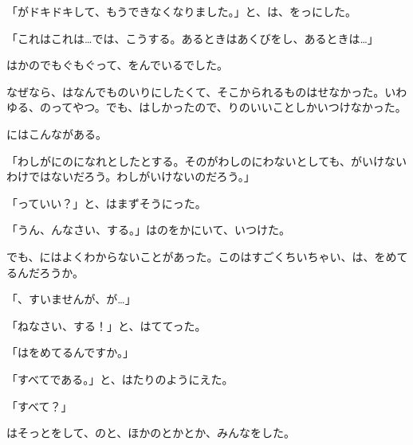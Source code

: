 「がドキドキして、もうできなくなりました。」と、は、をっにした。

「これはこれは…では、こうする。あるときはあくびをし、あるときは…」

はかのでもぐもぐって、をんでいるでした。

なぜなら、はなんでものいりにしたくて、そこかられるものはせなかった。いわゆる、のってやつ。でも、はしかったので、りのいいことしかいつけなかった。

にはこんながある。

「わしがにのになれとしたとする。そのがわしのにわないとしても、がいけないわけではないだろう。わしがいけないのだろう。」

「っていい？」と、はまずそうにった。

「うん、んなさい、する。」はのをかにいて、いつけた。

でも、にはよくわからないことがあった。このはすごくちいちゃい、は、をめてるんだろうか。

「、すいませんが、が…」

「ねなさい、する！」と、はててった。

「はをめてるんですか。」

「すべてである。」と、はたりのようにえた。

「すべて？」

はそっとをして、のと、ほかのとかとか、みんなをした。

